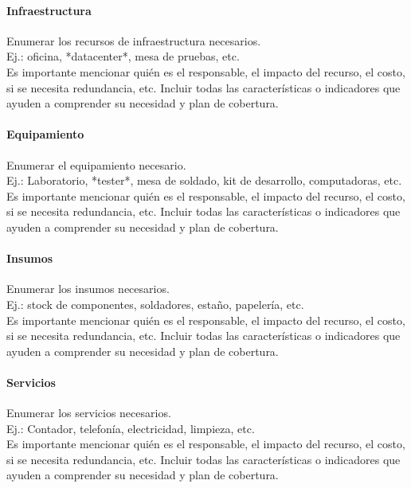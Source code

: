     \paragraph{Infraestructura}
    {\consigna
    Enumerar los recursos de infraestructura necesarios.\\
    Ej.: oficina, *datacenter*, mesa de pruebas, etc.\\
    Es importante mencionar quién es el responsable, el impacto del recurso, el costo, si se necesita redundancia, etc. Incluir todas las características o indicadores que ayuden a comprender su necesidad y plan de cobertura.
    }

    \paragraph{Equipamiento}
    {\consigna
    Enumerar el equipamiento necesario.\\
    Ej.: Laboratorio, *tester*, mesa de soldado, kit de desarrollo, computadoras, etc.\\
    Es importante mencionar quién es el responsable, el impacto del recurso, el costo, si se necesita redundancia, etc. Incluir todas las características o indicadores que ayuden a comprender su necesidad y plan de cobertura.
    }

    \paragraph{Insumos}
    {\consigna
    Enumerar los insumos necesarios.\\
    Ej.: stock de componentes, soldadores, estaño, papelería, etc.\\
    Es importante mencionar quién es el responsable, el impacto del recurso, el costo, si se necesita redundancia, etc. Incluir todas las características o indicadores que ayuden a comprender su necesidad y plan de cobertura.
    }

    \paragraph{Servicios}
    {\consigna
    Enumerar los servicios necesarios.\\
    Ej.: Contador, telefonía, electricidad, limpieza, etc.\\
    Es importante mencionar quién es el responsable, el impacto del recurso, el costo, si se necesita redundancia, etc. Incluir todas las características o indicadores que ayuden a comprender su necesidad y plan de cobertura.
    }

